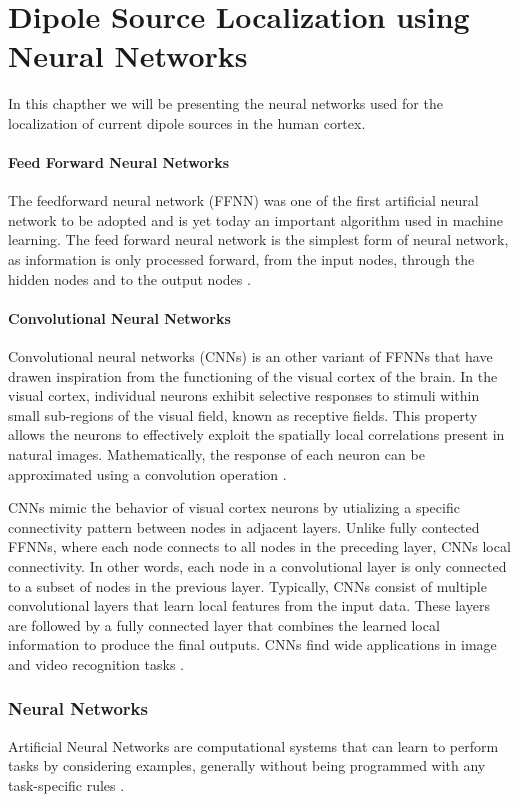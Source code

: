 \documentclass[a4paper, UKenglish, 11pt]{uiomaster}
\begin{document}
\chapter{Dipole Source Localization using Neural Networks}
In this chapther we will be presenting the neural networks used for the localization of current dipole sources in the human cortex.


\subsubsection{Feed Forward Neural Networks}
The feedforward neural network (FFNN) was one of the first artificial neural network to be adopted and is yet today an important algorithm used in machine learning. The feed forward neural network is the simplest form of neural network, as information is only processed forward, from the input nodes, through the hidden nodes and to the output nodes \cite{Hjorth-Jensen2022}.


\subsubsection{Convolutional Neural Networks}
Convolutional neural networks (CNNs) is an other variant of FFNNs that have drawen inspiration from the functioning of the visual cortex of the brain. In the visual cortex, individual neurons exhibit selective responses to stimuli within small sub-regions of the visual field, known as receptive fields. This property allows the neurons to effectively exploit the spatially local correlations present in natural images. Mathematically, the response of each neuron can be approximated using a convolution operation \cite{Hjorth-Jensen2022}.

CNNs mimic the behavior of visual cortex neurons by utializing a specific connectivity pattern between nodes in adjacent layers. Unlike fully contected FFNNs, where each node connects to all nodes in the preceding layer, CNNs  local connectivity. In other words, each node in a convolutional layer is only connected to a subset of nodes in the previous layer. Typically, CNNs consist of multiple convolutional layers that learn local features from the input data. These layers are followed by a fully connected layer that combines the learned local information to produce the final outputs. CNNs find wide applications in image and video recognition tasks \cite{Hjorth-Jensen2022}.

\subsection{Neural Networks}
Artificial Neural Networks are computational systems that can learn to perform tasks by considering examples, generally without being programmed with any task-specific rules \cite{101}.
\end{document}
